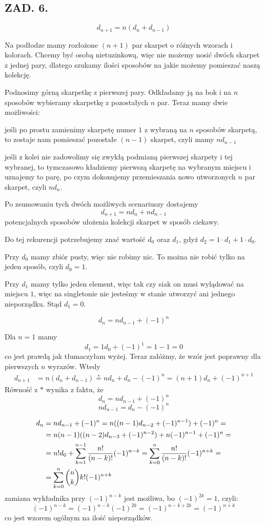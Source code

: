 \documentclass{article}[13pt]
\begin{document}
\subsection*{ZAD. 6.}

$$d_{n+1}=n(d_n+d_{n-1})$$

Na podłodze mamy rozłożone $(n+1)$ par skarpet o różnych wzorach i kolorach. Chcemy być osobą nietuzinkową, więc nie możemy nosić dwóch skarpet z jednej pary, dlatego szukamy ilości sposobów na jakie możemy pomieszać naszą kolekcję. 

Podnosimy górną skarpetkę z pierwszej pary. Odkładamy ją na bok i na $n$ sposobów wybieramy skarpetkę z pozostałych $n$ par. Teraz mamy dwie możliwości:

\point jeśli po prostu zamienimy skarpetę numer $1$ z wybraną na $n$ sposobów skarpetą, to zostaje nam pomieszać pozostałe $(n-1)$ skarpet, czyli mamy $nd_{n-1}$

\point jeśli z kolei nie zadowolimy się zwykłą podmianą pierwszej skarpety i tej wybranej, to tymczasowo kładziemy pierwszą skarpetę na wybranym miejscu i uznajemy to parę, po czym dokonujemy przemieszania nowo utworzonych $n$ par skarpet, czyli $nd_n$.
\medskip

Po zsumowaniu tych dwóch możliwych scenariuszy dostajemy
$$d_{n+1}=nd_n+nd_{n-1}$$
potencjalnych sposobów ułożenia kolekcji skarpet w sposób ciekawy.
\bigskip

Do tej rekurencji potrzebujemy znać wartość $d_0$ oraz $d_1$, gdyż $d_2=1\cdot d_1+1\cdot d_0$. 

Przy $d_0$ mamy zbiór pusty, więc nie robimy nic. To można nie robić tylko na jeden sposób, czyli $d_0=1$. 

Przy $d_1$ mamy tylko jeden element, więc tak czy siak on musi wylądować na miejscu $1$, więc na singletonie nie jesteśmy w stanie utworzyć ani jednego nieporządku. Stąd $d_1=0$.
\smallskip

$$d_n=nd_{n-1}+(-1)^n$$

Dla $n=1$ mamy 
$$d_1=1d_0+(-1)^1=1-1=0$$
co jest prawdą jak tłumaczyłam wyżej. Teraz załóżmy, że wzór jest poprawny dla pierwszych $n$ wyrazów. Wtedy
\begin{align*}
    d_{n+1}&=n(d_n+d_{n-1})\overset{*}{=}nd_n+d_n-(-1)^n=(n+1)d_n+(-1)^{n+1}
\end{align*}
Równość z $*$ wynika z faktu, że
$$d_n=nd_{n-1}+(-1)^n$$
$$nd_{n-1}=d_n-(-1)^n$$

\begin{align*}
    d_n&=nd_{n-1}+(-1)^n=n((n-1)d_{n-2}+(-1)^{n-1})+(-1)^n=\\
    &=n(n-1)((n-2)d_{n-3}+(-1)^{n-2})+n(-1)^{n-1}+(-1)^n=\\
    &=n!d_0+\sum\limits_{k=1}^{n-1}{n!\over (n-k)!}(-1)^{n-k}=\sum\limits_{k=0}^{n}{n!\over(n-k)!}(-1)^{n+k}=\\
    &=\sum\limits_{k=0}^n{n\choose k}k!(-1)^{n+k}
\end{align*}
zamiana wykładnika przy $(-1)^{n-k}$ jest możliwa, bo $(-1)^{2k}=1$, czyli:
$$(-1)^{n-k}=(-1)^{n-k}(-1)^{2k}=(-1)^{n-k+2k}=(-1)^{n+k}$$
co jest wzorem ogólnym na ilość nieporządków.
\end{document}
